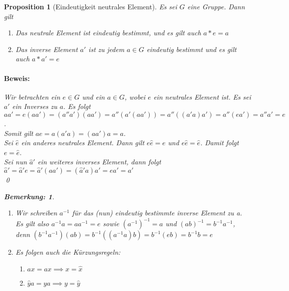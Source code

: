 \documentclass{report}
\theoremstyle{customrem}
\newtheorem*{bemerkung}{Bemerkung\textnormal:}
\theoremstyle{customdef}
\newtheorem{proposition}[definition]{Proposition}
\renewenvironment{proof}{\paragraph{Beweis: }}{\qed}
\begin{document}
	\begin{proposition}[Eindeutigkeit neutrales Element]
		Es sei \(G\) eine Gruppe. Dann gilt
		\begin{enumerate}
			\itemsep0cm
			\item Das neutrale Element ist eindeutig bestimmt, und es gilt auch \(a \ast e = a\)
			\item Das inverse Element \(a'\) ist zu jedem \(a \in G\) eindeutig bestimmt und es gilt auch \(a \ast a' = e\)
		\end{enumerate}
		\vspace{.25cm}
		\begin{proof}
			Wir betrachten ein \(e \in G\) und ein \(a \in G\), wobei \(e\) ein neutrales Element ist. Es sei \(a'\) ein Inverses zu \(a\). Es folgt 
			\(a a' = e (a a') = (a'' a') (a a') = a'' (a' (a a')) = a'' ((a' a) a') = a'' (e a') = a'' a' = e\).\\
			Somit gilt \(a e = a (a' a) = (a a') a = a\).\\
			Sei \(\hat{e}\) ein anderes neutrales Element. Dann gilt \(e \hat{e} = e\) und \(e \hat{e} = \hat{e}\). Damit folgt \(e = \hat{e}\).\\
			Sei nun \(\hat{a}'\) ein weiteres inverses Element, dann folgt 
			\(\hat{a}' = \hat{a}' e = \hat{a}' (aa') = (\hat{a}'a)a' = ea' = a'\)\\
		\end{proof}\vspace{.25cm}
		\begin{bemerkung} \( \)
			\begin{enumerate}
				\itemsep0cm
				\item Wir schreiben \(a^{-1}\) für das (nun) eindeutig bestimmte inverse Element zu a.
				Es gilt also \(a^{-1}a = aa^{-1} = e\) sowie \((a^{-1})^{-1} = a\) und \((ab)^{-1} = b^{-1}a^{-1}\), denn \((b^{-1}a^{-1})(ab) = b^{-1}((a^{-1}a)b) = b^{-1}(eb) = b^{-1}b = e\)
				\item Es folgen auch die Kürzungsregeln:
				\begin{enumerate}[leftmargin=3cm]
					\itemsep0cm
					\item \(a \hat{x} = ax \implies x = \hat{x}\)
					\item \(\hat{y}a = ya \implies y = \hat{y}\)
				\end{enumerate}
			\end{enumerate}
		\end{bemerkung}
	\end{proposition}
	
\end{document}
